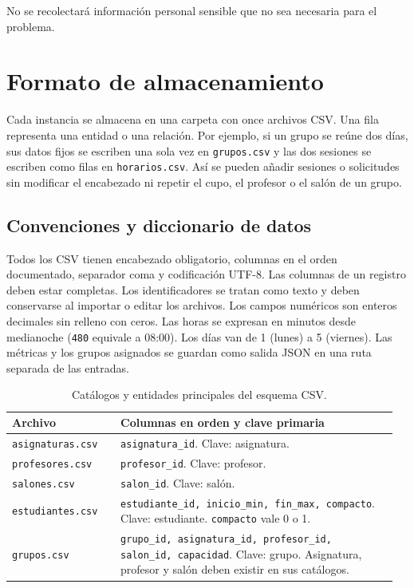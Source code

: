\documentclass[11pt]{article}
\numberwithin{equation}{section}
\numberwithin{figure}{section}
\numberwithin{table}{section}
\theoremstyle{definition}
\begin{document}
No se recolectará información personal sensible que no sea necesaria para el
problema.

\section{Formato de almacenamiento}
\label{sec:csv}

Cada instancia se almacena en una carpeta con once archivos CSV. Una fila
representa una entidad o una relación. Por ejemplo, si un grupo se reúne
dos días, sus datos fijos se escriben una sola vez en \texttt{grupos.csv}
y las dos sesiones se escriben como filas en \texttt{horarios.csv}.
Así se pueden añadir sesiones o solicitudes sin modificar el encabezado
ni repetir el cupo, el profesor o el salón de un grupo.

\subsection{Convenciones y diccionario de datos}

Todos los CSV tienen encabezado obligatorio, columnas en el orden documentado,
separador coma y codificación UTF-8. Las columnas de un registro deben estar
completas. Los identificadores se tratan como texto y deben conservarse
al importar o editar los archivos. Los campos numéricos son enteros decimales
sin relleno con ceros. Las horas se expresan en minutos desde medianoche
(\texttt{480} equivale a 08:00). Los días van de 1 (lunes) a 5 (viernes).
Las métricas y los grupos asignados se guardan como salida JSON en una ruta
separada de las entradas.

\begin{table}[H]
\centering
\caption{Catálogos y entidades principales del esquema CSV.}
\small
\begin{tabular}{@{}p{0.27\linewidth}p{0.69\linewidth}@{}}
\toprule
\textbf{Archivo} & \textbf{Columnas en orden y clave primaria} \\
\midrule
\texttt{asignaturas.csv} &
\texttt{asignatura\_id}. Clave: asignatura. \\
\texttt{profesores.csv} &
\texttt{profesor\_id}. Clave: profesor. \\
\texttt{salones.csv} &
\texttt{salon\_id}. Clave: salón. \\
\texttt{estudiantes.csv} &
\texttt{estudiante\_id, inicio\_min, fin\_max, compacto}.\newline
Clave: estudiante. \texttt{compacto} vale 0 o 1. \\
\texttt{grupos.csv} &
\texttt{grupo\_id, asignatura\_id, profesor\_id,}\newline
\texttt{salon\_id, capacidad}. Clave: grupo. Asignatura,
profesor y salón deben existir en sus catálogos. \\
\bottomrule
\end{tabular}
\end{table}
\end{document}
